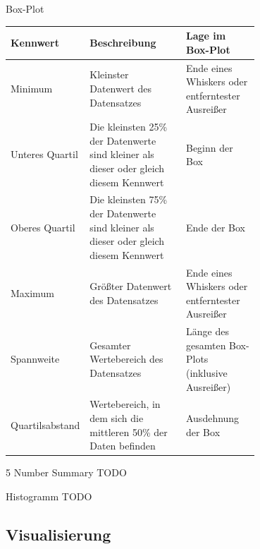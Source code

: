 \begin{defi}{Box-Plot}
    \begin{center}
        \begin{tabular}{|l|p{0.4\linewidth}|p{0.3\linewidth}|}
            \hline
            Kennwert        & Beschreibung                                                                          & Lage im Box-Plot                                   \\
            \hline
            \hline
            Minimum         & Kleinster Datenwert des Datensatzes                                                   & Ende eines Whiskers oder entferntester Ausreißer   \\
            \hline
            Unteres Quartil & Die kleinsten 25\% der Datenwerte sind kleiner als dieser oder gleich diesem Kennwert & Beginn der Box                                     \\
            \hline
            Oberes Quartil  & Die kleinsten 75\% der Datenwerte sind kleiner als dieser oder gleich diesem Kennwert & Ende der Box                                       \\
            \hline
            Maximum         & Größter Datenwert des Datensatzes                                                     & Ende eines Whiskers oder entferntester Ausreißer   \\
            \hline
            Spannweite      & Gesamter Wertebereich des Datensatzes                                                 & Länge des gesamten Box-Plots (inklusive Ausreißer) \\
            \hline
            Quartilsabstand & Wertebereich, in dem sich die mittleren 50\% der Daten befinden                       & Ausdehnung der Box                                 \\
            \hline
        \end{tabular}
    \end{center}
\end{defi}

\begin{bonus}{5 Number Summary}
    TODO
\end{bonus}

\begin{defi}{Histogramm}
    TODO
\end{defi}

\subsection{Visualisierung}

